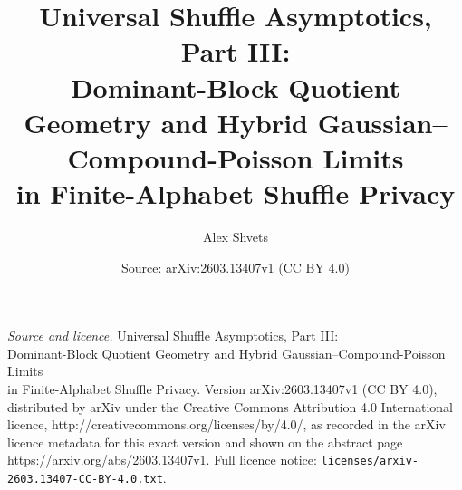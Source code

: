 \documentclass[10pt,a4paper]{amsart}
\title{Universal Shuffle Asymptotics, Part III:\\ Dominant-Block Quotient Geometry and Hybrid Gaussian--Compound-Poisson Limits\\ in Finite-Alphabet Shuffle Privacy}
\author{Alex Shvets}
\date{Source: arXiv:2603.13407v1 (CC BY 4.0)}
\begin{document}
\maketitle

\noindent\emph{Source and licence.} Universal Shuffle Asymptotics, Part III:\\ Dominant-Block Quotient Geometry and Hybrid Gaussian--Compound-Poisson Limits\\ in Finite-Alphabet Shuffle Privacy. Version arXiv:2603.13407v1 (CC BY 4.0), distributed by arXiv under the Creative Commons Attribution 4.0 International licence, http://creativecommons.org/licenses/by/4.0/, as recorded in the arXiv licence metadata for this exact version and shown on the abstract page https://arxiv.org/abs/2603.13407v1. Full licence notice: \texttt{licenses/arxiv-2603.13407-CC-BY-4.0.txt}.\par\smallskip
\end{document}
